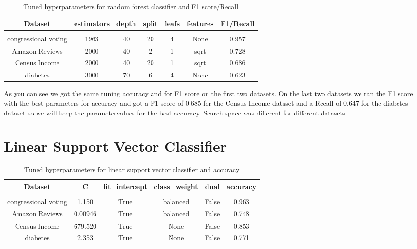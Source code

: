 \documentclass[a4paper,12pt]{article}
\begin{document}
\begin{table}[h!]
    \centering
    \begin{tabular}{|c|c|c|c|c|c|c|}
    \hline
    Dataset & \textbf{estimators} & \textbf{depth} & \textbf{split} & \textbf{leafs} & \textbf{features} & F1/Recall \\
    \hline
    \multicolumn{7}{c}{\vspace{-0.4cm}} \\ %
    \hline
    congressional voting & 1963 & 40 & 20 & 4 & None & 0.957 \\%
    \hline
    Amazon Reviews & 2000 & 40 & 2 & 1 & sqrt & 0.728 \\%
    \hline
    Census Income & 2000 & 40 & 20 & 1 & sqrt & 0.686 \\%
    \hline
    diabetes & 3000 & 70 & 6 & 4 & None & 0.623 \\%
    \hline
    \end{tabular}
    \caption{Tuned hyperparameters for random forest classifier and F1 score/Recall} 
    \label{table:tu_hyp_rf_f1}
    \end{table}

As you can see we got the same tuning accuracy and for F1 score on the first two datasets. On the last two datasets we ran the F1 score with the best parameters for accuracy and got a F1 score of 0.685 for the Census Income dataset and a Recall of 0.647 for the diabetes dataset so we will keep the parametervalues for the best accuracy.
Search space was different for different datasets.


\section{Linear Support Vector Classifier}

\begin{table}[h!]
    \centering
    \begin{tabular}{|c|c|c|c|c|c|}
    \hline
    Dataset & \textbf{C} & \textbf{fit\_intercept} &  \textbf{class\_weight} & \textbf{dual} & accuracy \\
    \hline
    \multicolumn{6}{c}{\vspace{-0.4cm}} \\ %
    \hline
    congressional voting & 1.150 & True & balanced & False & 0.963 \\%
    \hline
    Amazon Reviews & 0.00946 & True & balanced & False & 0.748 \\%
    \hline
    Census Income & 679.520 & True & None & False & 0.853 \\%
    \hline
    diabetes & 2.353 & True & None & False  & 0.771 \\%
    \hline
    \end{tabular}
    \caption{Tuned hyperparameters for linear support vector classifier and accuracy} 
    \label{table:tu_hyp_svc_ac}
    \end{table}
\end{document}
